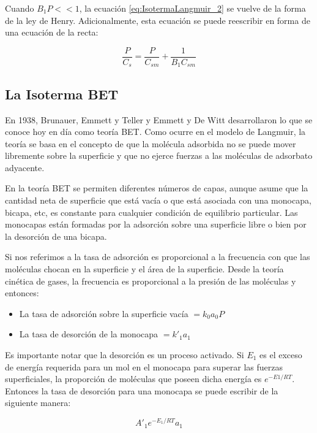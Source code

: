 \documentclass[11pt]{book}
\begin{document}
Cuando $B_1 P << 1$, la ecuación \ref{eq:IsotermaLangmuir_2} se vuelve de la forma de la ley de Henry. Adicionalmente, esta ecuación se puede reescribir en forma de una ecuación de la recta:

\begin{equation}
    \label{eq:IsotermaLangmuir_3}
    \frac{P}{C_s} = \frac{P}{C_{sm}} + \frac{1}{B_1 C_{sm}}
\end{equation}

\subsection{La Isoterma BET}

En 1938, Brunauer, Emmett y Teller y Emmett y De Witt desarrollaron lo que se conoce hoy en día como teoría BET. Como ocurre en el modelo de Langmuir, la teoría se basa en el concepto de que la molécula adsorbida no se puede mover libremente sobre la superficie y que no ejerce fuerzas a las moléculas de adsorbato adyacente. 

En la teoría BET se permiten diferentes números de capas, aunque asume que la cantidad neta de superficie que está vacía o que está asociada con una monocapa, bicapa, etc, es constante para cualquier condición de equilibrio particular. Las monocapas están formadas por la adsorción sobre una superficie libre o bien por la desorción de una bicapa.

Si nos referimos a la tasa de adsorción es proporcional a la frecuencia con que las moléculas chocan en la superficie y el área de la superficie. Desde la teoría cinética de gases, la frecuencia es proporcional a la presión de las moléculas y entonces:

\begin{itemize}
    \item La tasa de adsorción sobre la superficie vacía $= k_0 a_0 P$
    \item La tasa de desorción de la monocapa $= k'_1 a_1$
\end{itemize}

Es importante notar que la desorción es un proceso activado. Si $E_1$ es el exceso de energía requerida para un mol en el monocapa para superar las fuerzas superficiales, la proporción de moléculas que poseen dicha energía es $e^{-E1/RT}$. Entonces la tasa de desorción para una monocapa se puede escribir de la siguiente manera:

\begin{equation}
    \label{eq:isotermabet_1}
    A'_1 e^{-E_1/RT} a_1
\end{equation}
\end{document}

